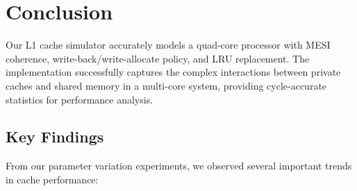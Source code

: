 \documentclass[11pt]{article}
\begin{document}
\section{Conclusion}

Our L1 cache simulator accurately models a quad-core processor with MESI coherence, write-back/write-allocate policy, and LRU replacement. The implementation successfully captures the complex interactions between private caches and shared memory in a multi-core system, providing cycle-accurate statistics for performance analysis.

\subsection{Key Findings}

From our parameter variation experiments, we observed several important trends in cache performance:
\end{document}
